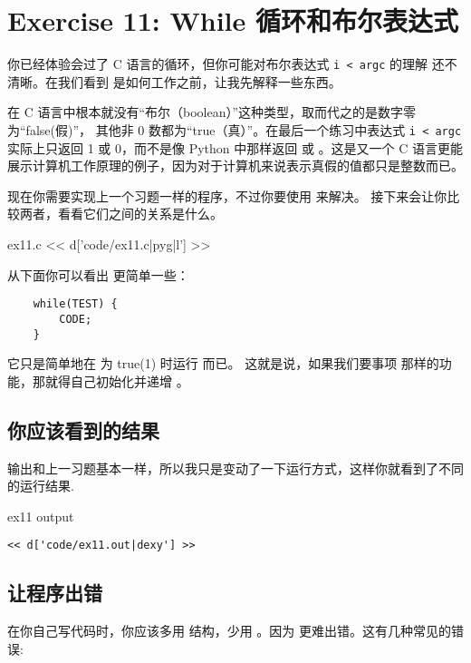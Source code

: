 \chapter{Exercise 11: While 循环和布尔表达式}

你已经体验会过了 C 语言的循环，但你可能对布尔表达式 \verb|i < argc| 的理解
还不清晰。在我们看到  是如何工作之前，让我先解释一些东西。

在 C 语言中根本就没有“布尔（boolean）”这种类型，取而代之的是数字零为“false(假)”，
其他非 0 数都为“true（真）”。在最后一个练习中表达式 \verb|i < argc| 实际上只返回 
1 或 0，而不是像 Python 中那样返回  或 。这是又一个 C 
语言更能展示计算机工作原理的例子，因为对于计算机来说表示真假的值都只是整数而已。

现在你需要实现上一个习题一样的程序，不过你要使用 来解决。 
接下来会让你比较两者，看看它们之间的关系是什么。

\begin{code}{ex11.c}
<< d['code/ex11.c|pyg|l'] >>
\end{code}

从下面你可以看出  更简单一些：

\begin{Verbatim}
    while(TEST) {
        CODE;
    }
\end{Verbatim}

它只是简单地在  为 true(1) 时运行 而已。
这就是说，如果我们要事项  那样的功能，那就得自己初始化并递增 。

\section{你应该看到的结果}

输出和上一习题基本一样，所以我只是变动了一下运行方式，这样你就看到了不同的运行结果.

\begin{code}{ex11 output}
\begin{lstlisting}
<< d['code/ex11.out|dexy'] >>
\end{lstlisting}
\end{code}

\section{让程序出错}

在你自己写代码时，你应该多用 结构，少用 。因为
 更难出错。这有几种常见的错误:

